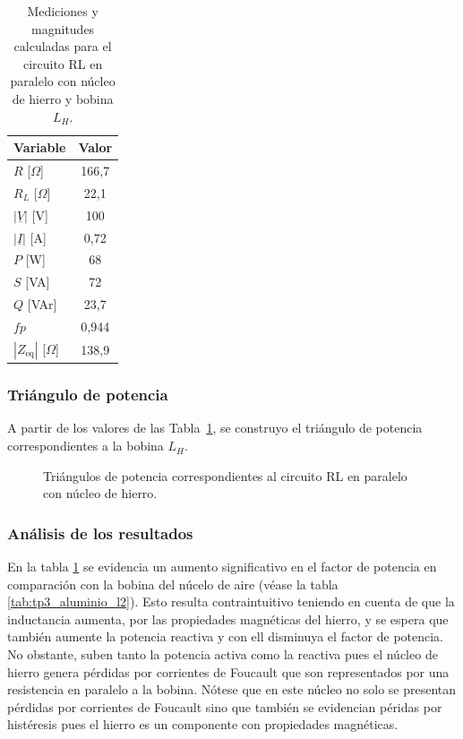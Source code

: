 \begin{table}[H]
    \centering
    \caption{Mediciones y magnitudes calculadas para el circuito RL en paralelo con núcleo de hierro y bobina $L_H$.}
    \label{tab:tp3_hierro_l2}
    \begin{tabular}{lc}
        \toprule
        Variable & Valor \\
        \midrule
        $R$ [$\Omega$] & 166,7 \\
        $R_L$ [$\Omega$] & 22,1 \\
        $|\underline{V}|$ [V] & 100 \\
        $|\underline{I}|$ [A] & 0,72 \\
        $P$ [W] & 68 \\
        $S$ [VA] & 72 \\
        $Q$ [VAr] & 23,7 \\
        $fp$ & 0,944 \\
        $|Z_{\text{eq}}|$ [$\Omega$] & 138,9 \\
        \bottomrule
    \end{tabular}
\end{table}

\subsubsection{Triángulo de potencia}

A partir de los valores de las Tabla~\ref{tab:tp3_hierro_l2}, se construyo el triángulo de potencia correspondientes a la bobina $L_H$.

\begin{figure}[H]
    \centering
    \begin{minipage}{0.38\textwidth}
        \centering
    \end{minipage}
    \caption{Triángulos de potencia correspondientes al circuito RL en paralelo con núcleo de hierro.}
    \label{fig:triangulos_hierro}
\end{figure}

\subsubsection{Análisis de los resultados}
En la tabla \ref{tab:tp3_hierro_l2} se evidencia un aumento significativo en el factor de potencia en comparación con la bobina del núcelo de aire (véase la tabla \ref{tab:tp3_aluminio_l2}). Esto resulta contraintuitivo teniendo en cuenta de que la inductancia aumenta, por las propiedades magnéticas del hierro, y se espera que también aumente la potencia reactiva y con ell disminuya el factor de potencia. No obstante, suben tanto la potencia activa como la reactiva pues el núcleo de hierro genera pérdidas por corrientes de Foucault que son representados por una resistencia en paralelo a la bobina. Nótese que en este núcleo no solo se presentan pérdidas por corrientes de Foucault sino que también se evidencian péridas por histéresis pues el hierro es un componente con propiedades magnéticas.

